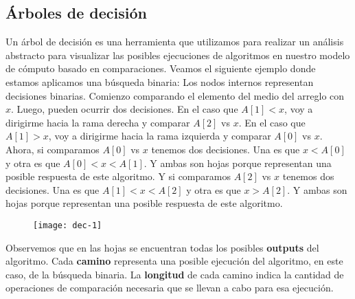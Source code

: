 \documentclass[10pt,a4paper]{article}
\begin{document}
\subsection{Árboles de decisión}

Un árbol de decisión es una herramienta que utilizamos para realizar un análisis abstracto para visualizar las posibles ejecuciones de algoritmos en nuestro modelo de cómputo basado en comparaciones.
\newline
\newline
Veamos el siguiente ejemplo donde estamos aplicamos una búsqueda binaria:
\newline
\newline
Los nodos internos representan decisiones binarias.
\newline
\newline
Comienzo comparando el elemento del medio del arreglo con $x$. Luego, pueden ocurrir dos decisiones. En el caso que $A[1] < x$, voy a dirigirme hacia la rama derecha y comparar $A[2]$ vs $x$. En el caso que $A[1] > x$, voy a dirigirme hacia la rama izquierda y comparar $A[0]$ vs $x$. 
\newline
\newline
Ahora, si comparamos $A[0]$ vs $x$ tenemos dos decisiones. Una es que $x < A[0]$ y otra es que $A[0] < x < A[1]$. Y ambas son hojas porque representan una posible respuesta de este algoritmo.
\newline
\newline
Y si comparamos $A[2]$ vs $x$ tenemos dos decisiones. Una es que $A[1] < x < A[2]$ y otra es que $x > A[2]$. Y ambas son hojas porque representan una posible respuesta de este algoritmo.
\newline
\newline
\begin{figure}[h]
	\centering
\texttt{[image: dec-1]}
	\label{drivers1}
\end{figure}
\newline
\newline
Observemos que en las hojas se encuentran todas los posibles \textbf{outputs} del algoritmo.
\newline
\newline
Cada \textbf{camino} representa una posible ejecución del algoritmo, en este caso, de la búsqueda binaria.
\newline
\newline
La \textbf{longitud} de cada camino indica la cantidad de operaciones de comparación necesaria que se llevan a cabo para esa ejecución. 
\end{document}
